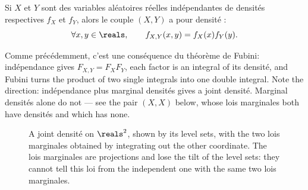 \begin{prop}
  Si $X$ et $Y$ sont des variables aléatoires réelles indépendantes de densités
  respectives $f_{X}$ et $f_{Y}$, alors le couple $(X,Y)$ a pour densité :
  \[
    \forall x,y \in \reals, \qquad f_{X,Y}(x,y) = f_{X}(x) f_{Y}(y).
  \]
\end{prop}

\begin{remark}
  Comme précédemment, c'est une conséquence du théorème de Fubini: indépendance
  gives $F_{X,Y} = F_{X}F_{Y}$, each factor is an integral of its densité, and
  Fubini turns the product of two single integrals into one double integral. Note
  the direction: indépendance plus marginal densités gives a joint densité.
  Marginal densités alone do not --- see the pair $(X,X)$ below, whose lois
  marginales both have densités and which has none.
\end{remark}

\begin{figure}[htbp]
  \centering
  \caption{A joint densité on $\reals^{2}$, shown by its level sets, with the two
  lois marginales obtained by integrating out the other coordinate. The lois
  marginales are projections and lose the tilt of the level sets: they cannot tell
  this loi from the independent one with the same two lois marginales.}
\end{figure}

